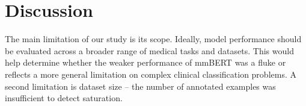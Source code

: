 \section{Discussion}

The main limitation of our study is its scope. Ideally, model
performance should be evaluated across a broader range of medical
tasks and datasets. This would help determine whether the weaker
performance of mmBERT was a fluke or reflects a more general
limitation on complex clinical classification problems. A second
limitation is dataset size -- the number of annotated examples was
insufficient to detect saturation.

